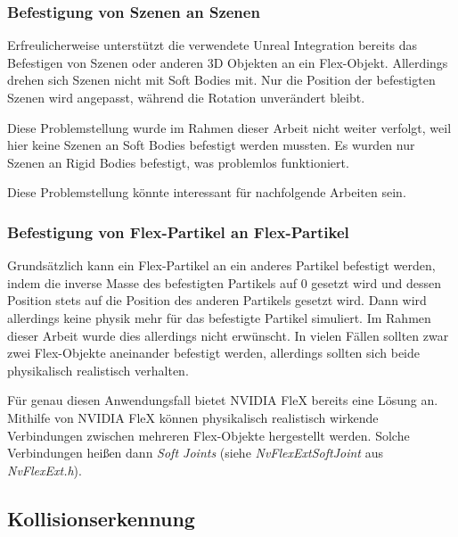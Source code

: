 


\subsubsection{Befestigung von Szenen an Szenen}

Erfreulicherweise unterstützt die verwendete Unreal Integration bereits das Befestigen von Szenen oder anderen 3D Objekten an ein Flex-Objekt. Allerdings drehen sich Szenen nicht mit Soft Bodies mit. Nur die Position der befestigten Szenen wird angepasst, während die Rotation unverändert bleibt. 

Diese Problemstellung wurde im Rahmen dieser Arbeit nicht weiter verfolgt, weil hier keine Szenen an Soft Bodies befestigt werden mussten. Es wurden nur Szenen an Rigid Bodies befestigt, was problemlos funktioniert.

Diese Problemstellung könnte interessant für nachfolgende Arbeiten sein.

\subsubsection{Befestigung von Flex-Partikel an Flex-Partikel}

Grundsätzlich kann ein Flex-Partikel an ein anderes Partikel befestigt werden, indem die inverse Masse des befestigten Partikels auf 0 gesetzt wird und dessen Position stets auf die Position des anderen Partikels gesetzt wird. Dann wird allerdings keine physik mehr für das befestigte Partikel simuliert. Im Rahmen dieser Arbeit wurde dies allerdings nicht erwünscht. In vielen Fällen sollten zwar zwei Flex-Objekte aneinander befestigt werden, allerdings sollten sich beide physikalisch realistisch verhalten. 

Für genau diesen Anwendungsfall bietet NVIDIA FleX bereits eine Lösung an. Mithilfe von NVIDIA FleX können physikalisch realistisch wirkende Verbindungen zwischen mehreren Flex-Objekte hergestellt werden. Solche Verbindungen heißen dann \textit{Soft Joints} (siehe \textit{NvFlexExtSoftJoint} aus \textit{NvFlexExt.h}).

\subsection{Kollisionserkennung}


